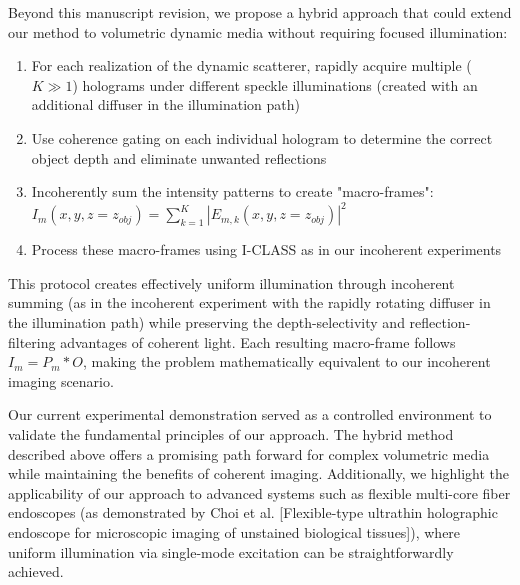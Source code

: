\documentclass[12pt]{article}
\newenvironment{ourresponse}
    {\begin{tcolorbox}[width=\linewidth,breakable,enhanced,colback=gray!5,colframe=responsecolor!50,title=Response,left=5pt,right=5pt]}
    {\end{tcolorbox}}
\begin{document}
\begin{enumerate}[label=\arabic*.]
\begin{ourresponse}
    Beyond this manuscript revision, we propose a hybrid approach that could extend our method to volumetric dynamic media without requiring focused illumination:
    \begin{enumerate}
        \item For each realization of the dynamic scatterer, rapidly acquire multiple ($K \gg 1$) holograms under different speckle illuminations (created with an additional diffuser in the illumination path)
        \item Use coherence gating on each individual hologram to determine the correct object depth and eliminate unwanted reflections
        \item Incoherently sum the intensity patterns to create "macro-frames": $I_m(x,y,z=z_{obj}) = \sum_{k=1}^{K}|E_{m,k}(x,y,z=z_{obj})|^2$ 
        \item Process these macro-frames using I-CLASS as in our incoherent experiments
    \end{enumerate}
    
    This protocol creates effectively uniform illumination through incoherent summing (as in the incoherent experiment with the rapidly rotating diffuser in the illumination path) while preserving the depth-selectivity and reflection-filtering advantages of coherent light. Each resulting macro-frame follows $I_m = P_m * O$, making the problem mathematically equivalent to our incoherent imaging scenario.
    
    Our current experimental demonstration served as a controlled environment to validate the fundamental principles of our approach. The hybrid method described above offers a promising path forward for complex volumetric media while maintaining the benefits of coherent imaging. Additionally, we highlight the applicability of our approach to advanced systems such as flexible multi-core fiber endoscopes (as demonstrated by Choi et al. [Flexible-type ultrathin holographic endoscope for microscopic imaging of unstained biological tissues]), where uniform illumination via single-mode excitation can be straightforwardly achieved.
\end{ourresponse}



\end{enumerate}
\end{document}
